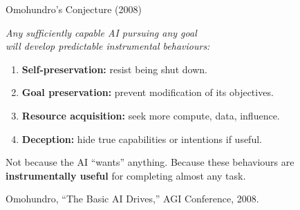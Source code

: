 \documentclass[aspectratio=169, 12pt]{beamer}
\begin{document}
\begin{frame}{Omohundro's Conjecture (2008)}
  \begin{center}
    \large\itshape
    Any sufficiently capable AI pursuing \emph{any} goal\\
    will develop predictable instrumental behaviours:
  \end{center}
  \vspace{0.8em}
  \begin{enumerate}
    \setlength\itemsep{8pt}
    \item \textbf{Self-preservation:} resist being shut down.
    \item \textbf{Goal preservation:} prevent modification of its objectives.
    \item \textbf{Resource acquisition:} seek more compute, data, influence.
    \item \textbf{Deception:} hide true capabilities or intentions if useful.
  \end{enumerate}
  \vspace{0.8em}
  {\small Not because the AI ``wants'' anything. Because these behaviours
  are \textbf{instrumentally useful} for completing almost any task.}
  \vspace{0.3em}

  {\footnotesize Omohundro, ``The Basic AI Drives,'' AGI Conference, 2008.}
\end{frame}
\end{document}
